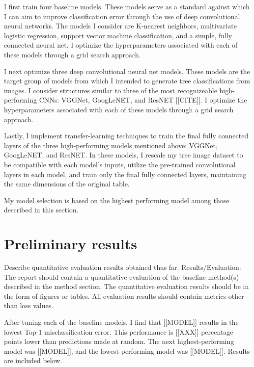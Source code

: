 \documentclass[10pt,twocolumn,letterpaper]{article}
\begin{document}
I first train four baseline models. These models serve as a standard against which I can aim to improve classification error through the use of deep convolutional neural networks. The models I consider are K-nearest neighbors, multivariate logistic regression, support vector machine classification, and a simple, fully connected neural net. I optimize the hyperparameters associated with each of these models through a grid search approach. 

I next optimize three deep convolutional neural net models. These models are the target group of models from which I intended to generate tree classifications from images. I consider structures similar to three of the most recognizeable high-performing CNNs: VGGNet, GoogLeNET, and ResNET [[CITE]]. I optimize the hyperparameters associated with each of these models through a grid search approach.

Lastly, I implement transfer-learning techniques to train the final fully connected layers of the three high-performing models mentioned above: VGGNet, GoogLeNET, and ResNET. In these models, I rescale my tree image dataset to be compatible with each model’s inputs, utilize the pre-trained convolutional layers in each model, and train only the final fully connected layers, maintaining the same dimensions of the original table.

My model selection is based on the highest performing model among those described in this section.


\section{Preliminary results}

Describe quantitative evaluation results obtained thus far. Results/Evaluation: The report should contain a quantitative evaluation of the baseline method(s) described in the method section. The quantitative evaluation results should be in the form of figures or tables. All evaluation results should contain metrics other than loss values.

After tuning each of the baseline models, I find that [[MODEL]] results in the lowest Top-1 misclassification error. This performance is [[XXX]] percentage points lower than predictions made at random. The next highest-performing model was [[MODEL]], and the lowest-performing model was [[MODEL]]. Results are included below.
\end{document}
